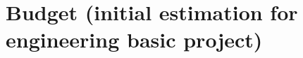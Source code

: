 \documentclass[12pt, titlepage]{scrartcl}
\begin{document}
%

%


\section{Budget (initial estimation for engineering basic project)}
%

\pagebreak
%
%
\end{document}
